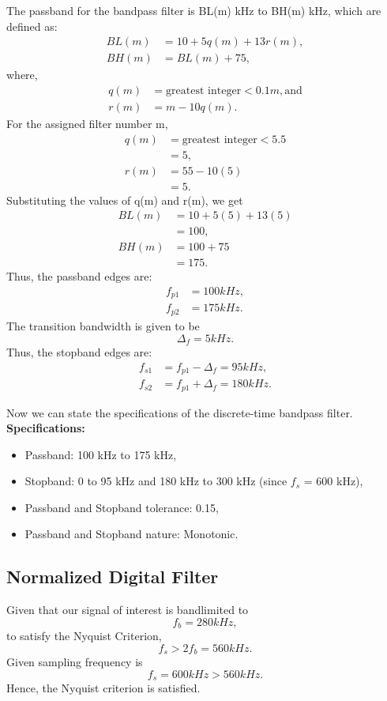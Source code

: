 \documentclass[12pt]{article}
\begin{document}
The passband for the bandpass filter is BL(m) kHz to BH(m) kHz, which are defined as:
\begin{align*}
    BL(m) &= 10 + 5 q(m) + 13 r(m),\\
    BH(m) &= BL(m) + 75,
\end{align*}
where,
\begin{align*}
    q(m) &= \text{greatest integer} < 0.1m, \text{and}\\
    r(m) &= m - 10q(m).
\end{align*}
For the assigned filter number m,
\begin{align*}
    q(m) &= \text{greatest integer} < 5.5\\
    &= 5,\\
    r(m) &= 55 - 10(5)\\
    &= 5.
\end{align*}
Substituting the values of q(m) and r(m), we get
\begin{align*}
    BL(m) &= 10 + 5(5) + 13(5)\\
    &= 100,\\
    BH(m) &= 100 + 75\\
    &= 175.
\end{align*}
Thus, the passband edges are:
\begin{align*}
    f_{p1} &= 100 kHz,\\
    f_{p2} &= 175 kHz.
\end{align*}
The transition bandwidth is given to be\[\Delta_f = 5 kHz.\]
Thus, the stopband edges are:
\begin{align*}
    f_{s1} &= f_{p1} - \Delta_f = 95 kHz,\\
    f_{s2} &= f_{p1} + \Delta_f = 180 kHz.
\end{align*}

Now we can state the specifications of the discrete-time bandpass filter.
\newline
\hline
\vspace{10pt}
\textbf{Specifications:}
\begin{itemize}
    \item Passband: 100 kHz to 175 kHz,
    \item Stopband: 0 to 95 kHz and 180 kHz to 300 kHz (since $f_s$ = 600 kHz),
    \item Passband and Stopband tolerance: 0.15,
    \item Passband and Stopband nature: Monotonic.
\end{itemize}
\hline

\subsection{Normalized Digital Filter}
Given that our signal of interest is bandlimited to
\[f_b = 280 kHz,\]
to satisfy the Nyquist Criterion,
\[f_s > 2 f_b = 560 kHz.\]
Given sampling frequency is
\[f_s = 600 kHz > 560 kHz.\]
Hence, the Nyquist criterion is satisfied.
\end{document}
